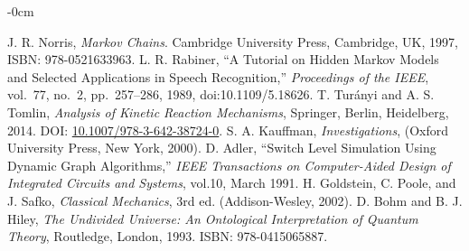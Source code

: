 \documentclass[entropy,article,submit,pdftex,oneauthor]{Definitions/mdpi}
\begin{document}
\begin{adjustwidth}{-\extralength}{0cm}
\begin{thebibliography}{999}
    J. R. Norris, \emph{Markov Chains}. Cambridge University Press, Cambridge, UK, 1997, ISBN: 978-0521633963.
    L. R. Rabiner, ``A Tutorial on Hidden Markov Models and Selected Applications in Speech Recognition,'' 
    \emph{Proceedings of the IEEE}, vol.~77, no.~2, pp.~257--286, 1989, doi:10.1109/5.18626.
    T. Turányi and A. S. Tomlin, \emph{Analysis of Kinetic Reaction Mechanisms}, Springer, Berlin, Heidelberg, 2014. DOI: \href{https://doi.org/10.1007/978-3-642-38724-0}{10.1007/978-3-642-38724-0}.
    S. A. Kauffman, \emph{Investigations}, (Oxford University Press, New York, 2000).
    D. Adler, ``Switch Level Simulation Using Dynamic Graph Algorithms,'' \emph{IEEE Transactions on Computer-Aided Design of Integrated Circuits and Systems}, vol.10, March 1991.
     H. Goldstein, C. Poole, and J. Safko, \textit{Classical Mechanics}, 3rd ed. (Addison-Wesley, 2002).
    D. Bohm and B. J. Hiley, \emph{The Undivided Universe: An Ontological Interpretation of Quantum Theory}, Routledge, London, 1993. ISBN: 978-0415065887.

\end{thebibliography}

%


\PublishersNote{}
\end{adjustwidth}
\end{document}
